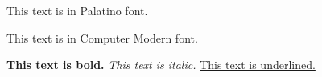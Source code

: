 \documentclass[a4paper,10pt]{article}
\begin{document}
\selectfont %
This text is in Palatino font.

\selectfont %
This text is in Computer Modern font.

\textbf{This text is bold.}
\textit{This text is italic.}
\underline{This text is underlined.}
\end{document}
